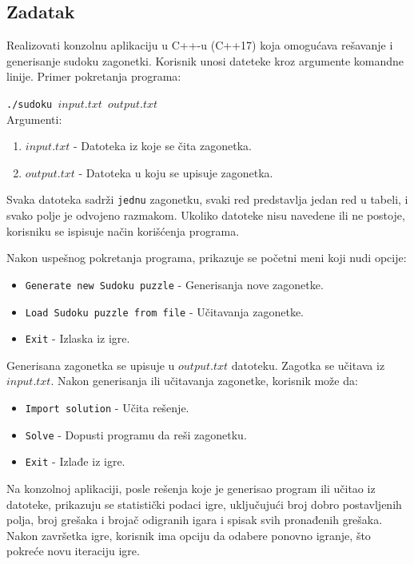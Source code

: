 \documentclass[a4paper]{article}
\begin{document}
    \subsection{Zadatak}
    Realizovati konzolnu aplikaciju u C++-u (C++17) koja omogućava rešavanje i generisanje sudoku zagonetki. Korisnik unosi dateteke kroz argumente komandne linije. 
    Primer pokretanja programa:
    \par\texttt{./sudoku $input.txt$ $output.txt$}\\
    Argumenti:
    \begin{enumerate}
        \item $input.txt$ - Datoteka iz koje se čita zagonetka.
        \item $output.txt$ - Datoteka u koju se upisuje zagonetka.
    \end{enumerate}
    \par Svaka datoteka sadrži \texttt{jednu} zagonetku, svaki red predstavlja jedan red u tabeli, i svako polje je odvojeno razmakom. Ukoliko datoteke nisu navedene ili ne postoje,
    korisniku se ispisuje način korišćenja programa.
    \par Nakon uspešnog pokretanja programa, prikazuje se početni meni koji nudi opcije:
    \begin{itemize}
        \item \texttt{Generate new Sudoku puzzle} - Generisanja nove zagonetke.
        \item \texttt{Load Sudoku puzzle from file} - Učitavanja zagonetke.
        \item \texttt{Exit} - Izlaska iz igre.
    \end{itemize}
    Generisana zagonetka se upisuje u $output.txt$ datoteku. Zagotka se učitava iz $input.txt$.
    Nakon generisanja ili učitavanja zagonetke, korisnik može da:
    \begin{itemize}
        \item \texttt{Import solution} - Učita rešenje.
        \item \texttt{Solve} - Dopusti programu da reši zagonetku.
        \item \texttt{Exit} - Izlađe iz igre.
    \end{itemize}
    \par Na konzolnoj aplikaciji, posle rešenja koje je generisao program ili učitao iz datoteke, prikazuju se statistički podaci igre, uključujući broj dobro 
    postavljenih polja, broj grešaka i brojač odigranih igara i spisak svih pronađenih grešaka. Nakon završetka igre, korisnik ima opciju da odabere ponovno igranje, 
    što pokreće novu iteraciju igre.
    \newpage
\end{document}

